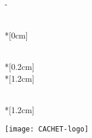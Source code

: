 \thispagestyle{empty}             %
\calccentering{\unitlength}
\begin{adjustwidth*}{\unitlength}{-\unitlength}
    \begin{adjustwidth}{-0.5cm}{-0.5cm}
        \sffamily
        \begin{flushright}
            \thesistypeabbr{} \\*[0cm]
            \thesistype{}\\
        \end{flushright}
        \vspace*{\fill}
        \noindent
        \HUGE \thesistitle{}\\*[0.2cm]
        \Huge \thesissubtitle{}\\*[1.2cm]
        \parbox[b]{0.5\linewidth}{%
            \LARGE 
            \thesisauthor{}\\*[1.2cm]
            \Large
            \thesislocation{} \the\year
        }
        \hfill\texttt{[image: CACHET-logo]}
    \end{adjustwidth}
\end{adjustwidth*}
\normalfont
\normalsize
